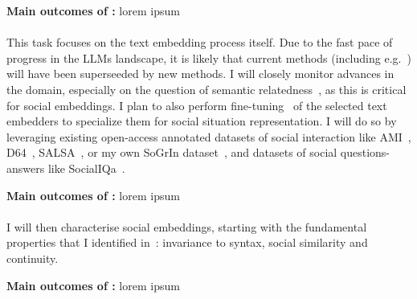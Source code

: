 \begin{framed}
    {\noindent\bf Main outcomes of \tAA:} lorem ipsum 
\end{framed}

\paragraph{\TAB}

This task focuses on the text embedding process itself. Due to the fast pace of
progress in the LLMs landscape, it is likely that current methods (including
e.g.~\cite{reimers2019sentencebert,muennighoff2022sgpt}) will have been
superseeded by new methods. I will closely monitor advances in the domain,
especially on the question of semantic relatedness~\cite{thakur2021beir}, as
this is critical for social embeddings. I plan to also perform
fine-tuning~\cite{hadsell2006dimensionality} of the selected text embedders to
specialize them for social situation representation. I will do so by leveraging
existing open-access annotated datasets of social interaction like
AMI~\cite{carletta2007ami}, D64~\cite{oertel2013d64},
SALSA~\cite{alameda2015salsa}, or my own SoGrIn dataset~\cite{webb2023sogrin},
and datasets of social questions-answers like SocialIQa~\cite{sap2019social}.

\begin{framed}
    {\noindent\bf Main outcomes of \tAB:} lorem ipsum 
\end{framed}

    \paragraph{\TAC}

\begin{rewrite}
I will then characterise social embeddings, starting with the fundamental
properties that I identified in~\cite{lemaignan2024social}: invariance to
syntax, social similarity and continuity. 
\end{rewrite}

\begin{framed}
    {\noindent\bf Main outcomes of \tAC:} lorem ipsum 
\end{framed}

\paragraph{\TAD}


